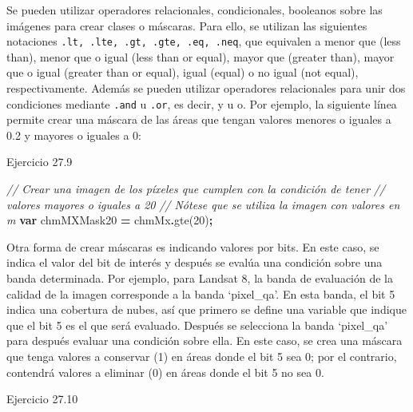\documentclass[
  12pt,
  letterpaper,
  twoside]{book}
\newenvironment{Shaded}{\begin{snugshade}}{\end{snugshade}}
\newcommand{\CommentTok}[1]{\textcolor[rgb]{0.56,0.35,0.01}{\textit{#1}}}
\newcommand{\DecValTok}[1]{\textcolor[rgb]{0.00,0.00,0.81}{#1}}
\newcommand{\FunctionTok}[1]{\textcolor[rgb]{0.00,0.00,0.00}{#1}}
\newcommand{\KeywordTok}[1]{\textcolor[rgb]{0.13,0.29,0.53}{\textbf{#1}}}
\newcommand{\NormalTok}[1]{#1}
\newcommand{\OperatorTok}[1]{\textcolor[rgb]{0.81,0.36,0.00}{\textbf{#1}}}
\begin{document}
Se pueden utilizar operadores relacionales, condicionales, booleanos sobre las imágenes para crear clases o máscaras. Para ello, se utilizan las siguientes notaciones \texttt{.lt,\ .lte,\ .gt,\ .gte,\ .eq,\ .neq}, que equivalen a menor que (less than), menor que o igual (less than or equal), mayor que (greater than), mayor que o igual (greater than or equal), igual (equal) o no igual (not equal), respectivamente. Además se pueden utilizar operadores relacionales para unir dos condiciones mediante \texttt{.and} u \texttt{.or}, es decir, y u o. Por ejemplo, la siguiente línea permite crear una máscara de las áreas que tengan valores menores o iguales a 0.2 y mayores o iguales a 0:

Ejercicio 27.9

\begin{Shaded}
\begin{Highlighting}[]
\CommentTok{// Crear una imagen de los píxeles que cumplen con la condición de tener }
\CommentTok{// valores mayores o iguales a 20}
\CommentTok{// Nótese que se utiliza la imagen con valores en m}
\KeywordTok{var}\NormalTok{ chmMXMask20 }\OperatorTok{=}\NormalTok{ chmMx}\OperatorTok{.}\FunctionTok{gte}\NormalTok{(}\DecValTok{20}\NormalTok{)}\OperatorTok{;}
\end{Highlighting}
\end{Shaded}

Otra forma de crear máscaras es indicando valores por bits. En este caso, se indica el valor del bit de interés y después se evalúa una condición sobre una banda determinada. Por ejemplo, para Landsat 8, la banda de evaluación de la calidad de la imagen corresponde a la banda `pixel\_qa'. En esta banda, el bit 5 indica una cobertura de nubes, así que primero se define una variable que indique que el bit 5 es el que será evaluado. Después se selecciona la banda `pixel\_qa' para después evaluar una condición sobre ella. En este caso, se crea una máscara que tenga valores a conservar (1) en áreas donde el bit 5 sea 0; por el contrario, contendrá valores a eliminar (0) en áreas donde el bit 5 no sea 0.

Ejercicio 27.10
\end{document}

